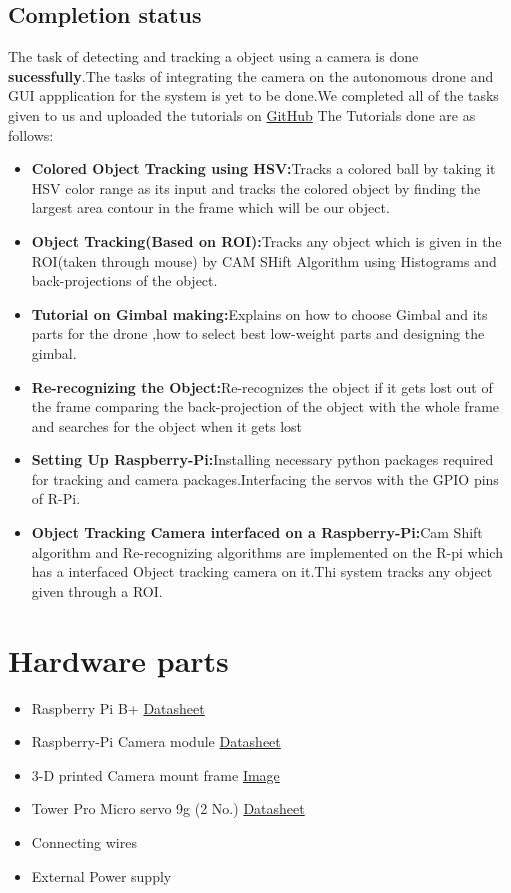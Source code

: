\documentclass[a4paper,12pt,oneside]{book}
\begin{document}
\subsection*{Completion status}
The task of detecting and tracking a object using a camera is done \textbf{sucessfully}.The tasks of integrating the camera on the autonomous drone and GUI appplication for the system is yet to be done.We completed all of the tasks given to us and uploaded the tutorials on \href{https://github.com/eYSIP-2016/Object-Tracking-Camera}{GitHub}
The Tutorials done are as follows:
\begin{itemize}
 \item \textbf{Colored Object Tracking using HSV:}Tracks a colored ball by taking it HSV color range as its input and tracks the colored object by finding the largest area contour in the frame which will be our object.
 \item \textbf{Object Tracking(Based on ROI):}Tracks any object which is given in the ROI(taken through mouse) by CAM SHift Algorithm using Histograms and back-projections of the object.
 \item \textbf{Tutorial on Gimbal making:}Explains on how to choose Gimbal and its parts for the drone ,how to select best low-weight parts and designing the gimbal.
 \item \textbf{Re-recognizing the Object:}Re-recognizes the object if it gets lost out of the frame comparing the back-projection of the object with the whole frame and searches for the object when it gets lost
 \item \textbf{Setting Up Raspberry-Pi:}Installing necessary python packages required for tracking and camera packages.Interfacing the servos with the GPIO pins of R-Pi.
 \item \textbf{Object Tracking Camera interfaced on a Raspberry-Pi:}Cam Shift algorithm and Re-recognizing algorithms are implemented on the R-pi which has a interfaced Object tracking camera on it.Thi system tracks any object given through a ROI.
 \end{itemize}

\section{Hardware parts}
\begin{itemize}
  \item Raspberry Pi B+
\href{https://github.com/eYSIP-2016/Autonomous-Drone/blob/master/datasheets/raspberry%20pi%20B%2B.pdf}{Datasheet}
  \item Raspberry-Pi Camera module
  \href{https://www.raspberrypi.org/wp-content/uploads/2013/07/RaspiCam-Documentation.pdf}{Datasheet}
  \item 3-D printed Camera mount frame
  \href {https://github.com/eYSIP-2016/Object-Tracking-Camera/blob/master/Tutorials/5.%20Interfacing%20the%20Camera%20and%20Gimbal%20System%20with%20the%20Raspberry-Pi/frame.jpg}{Image}
  \item Tower Pro Micro servo 9g (2 No.)
  \href {http://www.micropik.com/PDF/SG90Servo.pdf}{Datasheet}
  \item Connecting wires
  \item External Power supply
\end{itemize} 
\end{document}
